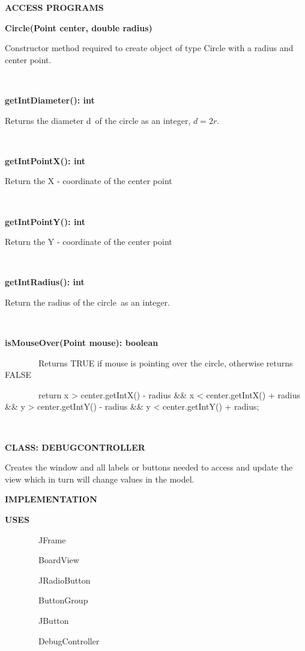 \documentclass{article}
\begin{document}
{{\textbf{ACCESS PROGRAMS}}

{\textbf{Circle(Point center, double radius)}}

{Constructor method required to create object of type Circle
with a radius and center point.}

{~~~~~~~~~~~~~~~~}

{\textbf{getIntDiameter(): int}}

{Returns the diameter }{d}{~of the circle as an integer, \(d = 2r\).}

{~~~~~~~~~~~~~~~~}

{\textbf{getIntPointX(): int}}

{Return the X - coordinate of the center point}

{~}

{\textbf{getIntPointY(): int}}

{Return the Y - coordinate of the center point}

{~~~~~~~~~~~~~~~~}

{\textbf{getIntRadius(): int}}

{Return the radius of the circle}{~as an integer.}

{~~~~~~~~~~~~~~~~}

{\textbf{isMouseOver(Point mouse): boolean}}

{~~~~~~~~Returns }{TRUE }{if mouse is pointing over the circle,
otherwise returns }{FALSE}

{~~~~~~~~}{return x \textgreater{} center.getIntX() - radius \&\& x
\textless{} center.getIntX() + radius \&\& y \textgreater{}
center.getIntY() - radius \&\& y \textless{} center.getIntY() +
radius;}

{}

{~~~~~~~~~~~~~~~~}

{}


{\textbf{CLASS: DEBUGCONTROLLER}}

{Creates the window and all labels or buttons needed to access and
update the view which in turn will change values in the model.}

{\textbf{IMPLEMENTATION}}

{}

{\textbf{USES}}

{~~~~~~~~JFrame}

{~~~~~~~~BoardView}

{~~~~~~~~JRadioButton}

{~~~~~~~~ButtonGroup}

{~~~~~~~~JButton}

{~~~~~~~~DebugController}

}
\end{document}
